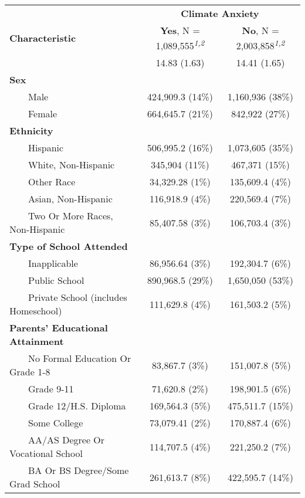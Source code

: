 \begin{table}[t]
\fontsize{12.0pt}{14.4pt}\selectfont
\begin{tabular*}{\linewidth}{@{\extracolsep{\fill}}lcc}
\toprule
 & \multicolumn{2}{c}{\textbf{Climate Anxiety}} \\ 
\cmidrule(lr){2-3}
\textbf{Characteristic} & \textbf{Yes}, N = 1,089,555\textsuperscript{\textit{1,2}} & \textbf{No}, N = 2,003,858\textsuperscript{\textit{1,2}} \\ 
\midrule\addlinespace[2.5pt]
{\bfseries Age} & 14.83 (1.63) & 14.41 (1.65) \\ 
{\bfseries Sex} &  &  \\ 
    Male & 424,909.3 (14\%)  & 1,160,936 (38\%)  \\ 
    Female & 664,645.7 (21\%)  & 842,922 (27\%)  \\ 
{\bfseries Ethnicity} &  &  \\ 
    Hispanic & 506,995.2 (16\%)  & 1,073,605 (35\%)  \\ 
    White, Non-Hispanic & 345,904 (11\%)  & 467,371 (15\%)  \\ 
    Other Race & 34,329.28 (1\%)  & 135,609.4 (4\%)  \\ 
    Asian, Non-Hispanic & 116,918.9 (4\%)  & 220,569.4 (7\%)  \\ 
    Two Or More Races, Non-Hispanic & 85,407.58 (3\%)  & 106,703.4 (3\%)  \\ 
{\bfseries Type of School Attended} &  &  \\ 
    Inapplicable & 86,956.64 (3\%)  & 192,304.7 (6\%)  \\ 
    Public School & 890,968.5 (29\%)  & 1,650,050 (53\%)  \\ 
    Private School (includes Homeschool) & 111,629.8 (4\%)  & 161,503.2 (5\%)  \\ 
{\bfseries Parents' Educational Attainment} &  &  \\ 
    No Formal Education Or Grade 1-8 & 83,867.7 (3\%)  & 151,007.8 (5\%)  \\ 
    Grade 9-11 & 71,620.8 (2\%)  & 198,901.5 (6\%)  \\ 
    Grade 12/H.S. Diploma & 169,564.3 (5\%)  & 475,511.7 (15\%)  \\ 
    Some College & 73,079.41 (2\%)  & 170,887.4 (6\%)  \\ 
    AA/AS Degree Or Vocational School & 114,707.5 (4\%)  & 221,250.2 (7\%)  \\ 
    BA Or BS Degree/Some Grad School & 261,613.7 (8\%)  & 422,595.7 (14\%)  \\ 

\end{tabular*}
\end{table}
